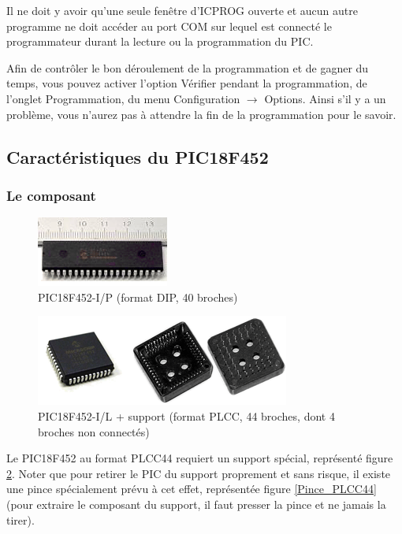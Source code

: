 \documentclass[a4paper]{article}
\begin{document}
Il ne doit y avoir qu'une seule fenêtre d'ICPROG ouverte et aucun autre programme ne doit accéder au port COM sur lequel est connecté le programmateur durant la lecture ou la programmation du PIC.

Afin de contrôler le bon déroulement de la programmation et de gagner du temps, vous pouvez activer l'option \og{}Vérifier pendant la programmation\fg{}, de l'onglet \og{}Programmation\fg{}, du menu \og{}Configuration\fg{} $\rightarrow$ \og{}Options\fg{}. Ainsi s'il y a un problème, vous n'aurez pas à attendre la fin de la programmation pour le savoir.

\subsection{Caractéristiques du PIC18F452}

\subsubsection{Le composant}

\begin{figure}[H]
	\centering
	\includegraphics[scale=0.75]{Images/PIC18F452_DIP40.png}
	\caption{PIC18F452-I/P (format DIP, 40 broches)
		\label{PIC18F452_DIP40}}
\end{figure}

\begin{figure}[H]
	\centering
	\includegraphics[scale=0.75]{Images/PIC18F452_PLCC44.png}
	\caption{PIC18F452-I/L + support (format PLCC, 44 broches, dont 4 broches non connectés)
		\label{PIC18F452_PLCC44}}
\end{figure}

Le PIC18F452 au format PLCC44 requiert un support spécial, représenté figure \ref{PIC18F452_PLCC44}. Noter que pour retirer le PIC du support proprement et sans risque, il existe une pince spécialement prévu à cet effet, représentée figure \ref{Pince_PLCC44} (pour extraire le composant du support, il faut presser la pince et ne jamais la tirer).
\end{document}

